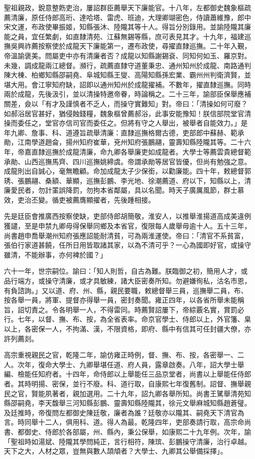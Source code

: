 \begin{pinyinscope}
聖祖親政，銳意整飭吏治，屢詔群臣薦舉天下廉能官。十八年，左都御史魏象樞疏薦清廉，原任侍郎高珩、達哈塔、雷虎、班迪，大理卿瑚密色，侍讀蕭維豫，郎中宋文運，布政使畢振姬，知縣張沐、陸隴其等十人。得旨分別錄用。並諭陸隴其廉能之員，宜任繁劇，如直隸清苑、江蘇無錫等縣，庶可表見其才。十九年，福建巡撫吳興祚薦按察使於成龍天下廉能第一，遷布政使，尋擢直隸巡撫。二十年入覲，帝溫諭褒美。問屬吏中亦有清廉者否？成龍以知縣謝錫袞、同知何如玉、羅京對。未幾，調成龍兩江總督。瀕行，疏薦直隸守道董秉忠、通州知州於成龍、南路通判陳大棟、柏鄉知縣邵嗣堯、阜城知縣王燮、高陽知縣孫宏業、霸州州判衛濟賢，並堪大用。會江寧知府缺，詔即以通州知州於成龍擢補。不數年，擢直隸巡撫。同時兩於成龍，先後汲引，並以清操特邀帝眷，時論稱之。二十三年，諭部臣保舉應補關差，僉以「有才及謹慎者不乏人，而操守實難知」對。帝曰：「清操如何可廢？如郝浴居官甚好，猶侵蝕錢糧，魏象樞曾薦郝浴，此事安能豫知！朕信部院堂官清操而委任之，堂官亦信司官而委任之。但將有守之人舉出，被舉者自能效力。」是年九卿、詹事、科、道遵旨疏舉清廉：直隸巡撫格爾古德，吏部郎中蘇赫、範承勛，江南學道趙侖，揚州知府崔華，兗州知府張鵬翮，靈壽知縣陸隴其等。二十六年，帝嘉直隸巡撫於成龍清廉，命九卿各舉廉吏如成龍者。大學士等薦雲貴總督範承勛、山西巡撫馬齊、四川巡撫姚締虞。帝謂承勛等居官皆優，但尚有勉強之意。成龍則出自誠心，毫無瞻顧。命加成龍太子少保銜，以勸廉能。四十年，敕總督郭琇、張鵬翮、桑額、華顯，巡撫彭鵬、李光地、徐潮薦道、府以下，知縣以上，清廉愛民者，勿計罣誤降罰，勿拘本省鄰屬，具以名聞。時天子廣厲風節，群士慕效，吏治丕變。循吏被薦膺顯擢者，先後踵相接。

先是廷臣會推廣西按察使缺，吏部侍郎胡簡敬，淮安人，以推舉淮揚道高成美違例獲譴，至是申禁九卿毋得保舉同鄉及本省官，復限每人歲舉毋逾十人。五十三年，尚書趙申喬舉潮州知府張應詔能耐清貧，可為兩淮運使。帝曰：「清官不系貧富，張伯行家道甚饒，任所日用皆取諸其家，以為不清可乎？一心為國即好官，或操守雖清，不能辦事，亦何裨於國？」

六十一年，世宗嗣位。諭曰：「知人則哲，自古為難。朕臨御之初，簡用人才，或品行端方，或操守清廉，或才具敏練，諸大臣密奏所知。勿避嫌徇私，沽名市恩，有負諮詢。」又以道、府、州、縣，親民要職，敕總督舉三員，巡撫舉二員，布、按各舉一員，將軍、提督亦得舉一員，密封奏聞。雍正四年，以各省所舉未能稱旨，詔切責之。令各明舉一人，不得雷同。時薦賢詔屢下，帝綜覈名實，賞罰必行。七年，以督、撫、布、按，為全省表率。命京官學士、侍郎以上，外官籓、臬以上，各密保一人，不拘滿、漢，不限資格，即府、縣中有信其可任封疆大僚，亦許列薦剡。

高宗重視親民之官，乾隆二年，諭仿雍正時例，督、撫、布、按，各密舉一、二人。次年，復命大學士、九卿舉堪任道、府人員，露章啟奏。八年，詔大學士舉編、檢能任知府者。十四年，命侍郎以上舉能任三品京堂者，尚書以上舉能任侍郎者。其時明揚、密保，並行不廢。科、道行取，自康熙七年復舊制。詔督、撫舉親民之官，賢能夙著者，親加選用。二十九年，詔九卿各舉所知。尚書王騭舉清苑知縣邵嗣堯，李天馥舉三河知縣彭鵬、靈壽知縣陸隴其，徐元文舉麻城知縣趙蒼璧。及廷推時，帝復問左都御史陳廷敬，廉者為誰？廷敬亦以隴其、嗣堯天下清官為言。時同舉十二人，俱用科、道。得人為最。乾隆四年，吏部奏請行取，高宗命尚書、都御史、侍郎於各部屬，州、縣內，秉公保舉，如康熙二十九年例。次年，諭「聖祖時如湯斌、陸隴其學問純正，言行相符，陳瑸、彭鵬操守清廉，治行卓越。天下之大，人材之眾，豈無與數人頡頏者？大學士、九卿其公舉備採擇」。


\end{pinyinscope}
